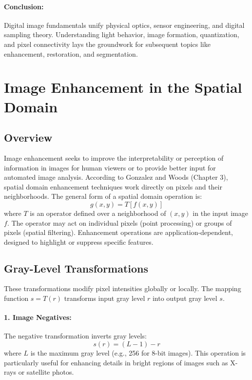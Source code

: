 \documentclass[12pt,a4paper]{AnantDocumentation}
\begin{document}
\paragraph{Conclusion:} Digital image fundamentals unify physical optics, sensor engineering, and digital sampling theory. Understanding light behavior, image formation, quantization, and pixel connectivity lays the groundwork for subsequent topics like enhancement, restoration, and segmentation.

\section{Image Enhancement in the Spatial Domain}

\subsection{Overview}
Image enhancement seeks to improve the interpretability or perception of information in images for human viewers or to provide better input for automated image analysis. According to Gonzalez and Woods (Chapter 3), spatial domain enhancement techniques work directly on pixels and their neighborhoods. The general form of a spatial domain operation is:
\begin{equation}
g(x, y) = T[f(x, y)]
\end{equation}
where $T$ is an operator defined over a neighborhood of $(x,y)$ in the input image $f$. The operator may act on individual pixels (point processing) or groups of pixels (spatial filtering). Enhancement operations are application-dependent, designed to highlight or suppress specific features.

\subsection{Gray-Level Transformations}
These transformations modify pixel intensities globally or locally. The mapping function $s = T(r)$ transforms input gray level $r$ into output gray level $s$.

\paragraph{1. Image Negatives:} The negative transformation inverts gray levels:
\begin{equation}
s(r) = (L - 1) - r
\end{equation}
where $L$ is the maximum gray level (e.g., 256 for 8-bit images). This operation is particularly useful for enhancing details in bright regions of images such as X-rays or satellite photos.
\end{document}

